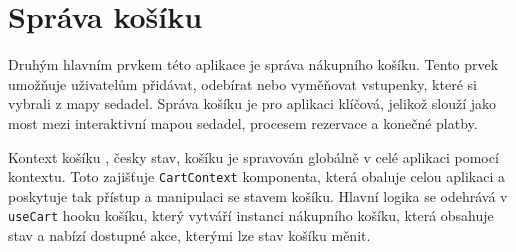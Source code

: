 \pagebreak
\section{Správa košíku}
\label{sec:implementace-kosik}
Druhým hlavním prvkem této aplikace je správa nákupního košíku.
Tento prvek umožňuje uživatelům přidávat, odebírat nebo vyměňovat vstupenky, které si vybrali z mapy sedadel.
Správa košíku je pro aplikaci klíčová, jelikož slouží jako most mezi interaktivní mapou sedadel, procesem rezervace a konečné platby.

\begin{subsection}{Kontext košíku}
    \label{subsec:implementace-kosik-kontext}
    , česky stav, košíku je spravován globálně v celé aplikaci pomocí kontextu.
    Toto zajišťuje \texttt{CartContext} komponenta, která obaluje celou aplikaci a poskytuje tak přístup a manipulaci se stavem košíku.
    Hlavní logika se odehrává v \texttt{useCart} hooku košíku, který vytváří instanci nákupního košíku, která obsahuje stav a nabízí dostupné akce, kterými lze stav košíku měnit.
\end{subsection}
\pagebreak


